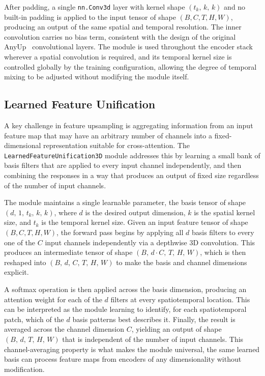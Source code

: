 After padding, a single \texttt{nn.Conv3d} layer with kernel shape $(t_k,\, k,\, k)$ and no built-in padding is applied to the input tensor of shape $(B, C, T, H, W)$, producing an output of the same spatial and temporal resolution. The inner convolution carries no bias term, consistent with the design of the original AnyUp~\cite{anyup} convolutional layers. The module is used throughout the encoder stack wherever a spatial convolution is required, and its temporal kernel size is controlled globally by the training configuration, allowing the degree of temporal mixing to be adjusted without modifying the module itself.

\subsection{Learned Feature Unification}
\label{sec:lfu3d}

A key challenge in feature upsampling is aggregating information from an input feature map that may have an arbitrary number of channels into a fixed-dimensional representation suitable for cross-attention. The \texttt{LearnedFeatureUnification3D} module addresses this by learning a small bank of basis filters that are applied to every input channel independently, and then combining the responses in a way that produces an output of fixed size regardless of the number of input channels.

The module maintains a single learnable parameter, the basis tensor of shape $(d,\, 1,\, t_k,\, k,\, k)$, where $d$ is the desired output dimension, $k$ is the spatial kernel size, and $t_k$ is the temporal kernel size. Given an input feature tensor of shape $(B, C, T, H, W)$, the forward pass begins by applying all $d$ basis filters to every one of the $C$ input channels independently via a depthwise 3D convolution. This produces an intermediate tensor of shape $(B,\, d \cdot C,\, T,\, H,\, W)$, which is then reshaped into $(B,\, d,\, C,\, T,\, H,\, W)$ to make the basis and channel dimensions explicit.

A softmax operation is then applied across the basis dimension, producing an attention weight for each of the $d$ filters at every spatiotemporal location. This can be interpreted as the module learning to identify, for each spatiotemporal patch, which of the $d$ basis patterns best describes it. Finally, the result is averaged across the channel dimension $C$, yielding an output of shape $(B,\, d,\, T,\, H,\, W)$ that is independent of the number of input channels. This channel-averaging property is what makes the module universal, the same learned basis can process feature maps from encoders of any dimensionality without modification.

